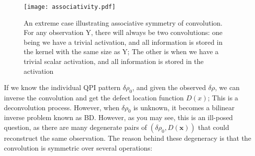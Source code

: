 \begin{figure}
	\texttt{[image: associativity.pdf]} 
	\centering
	\caption{An extreme case illustrating associative symmetry of convolution. For any observation Y, there will always be two convolutions: one being we have a trivial activation, and all information is stored in the kernel with the same size as Y; The other is when we have a trivial scalar activation, and all information is stored in the activation}
	\label{fig:ch6_assoc}
\end{figure}

\noindent If we know the individual QPI pattern $\delta\rho_0$, and given the observed $\delta\rho$, we can inverse the convolution and get the defect location function $D(x)$; This is a deconvolution process. However, when $\delta\rho_0$ is unknown, it becomes a bilinear inverse problem known as \ac{BD}. However, as you may see, this is an ill-posed question, as there are many degenerate pairs of $(\delta\rho_0, D(\mathbf{x}))$ that could reconstruct the same observation. The reason behind these degeneracy is that the convolution is symmetric over several operations: 
